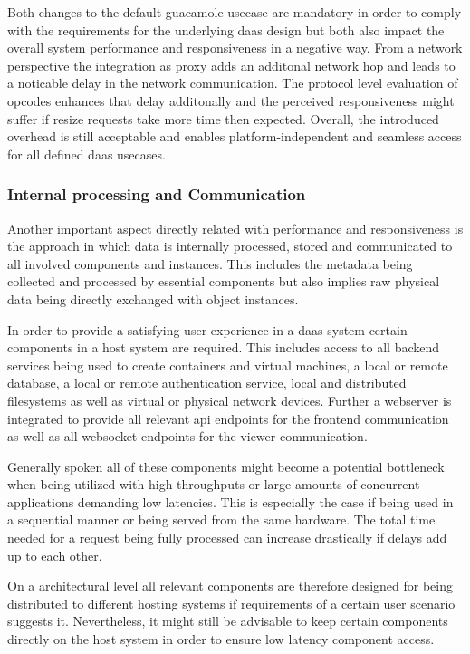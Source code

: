 \documentclass[runningheads]{llncs}
\begin{document}
Both changes to the default guacamole usecase are mandatory
in order to comply with the requirements for the underlying daas design
but both also impact the overall system performance and responsiveness in a negative way.
From a network perspective the integration as proxy adds an additonal network hop
and leads to a noticable delay in the network communication.
The protocol level evaluation of opcodes enhances that delay additonally
and the perceived responsiveness might suffer
if resize requests take more time then expected.
Overall, the introduced overhead is still acceptable
and enables platform-independent and seamless access for all defined daas usecases.

\subsubsection{Internal processing and Communication}
Another important aspect directly related with performance and responsiveness
is the approach in which data is internally processed, stored and communicated
to all involved components and instances.
This includes the metadata being collected and processed by essential components
but also implies raw physical data being directly exchanged with object instances.

In order to provide a satisfying user experience in a daas system
certain components in a host system are required.
This includes access to all backend services
being used to create containers and virtual machines,
a local or remote database, a local or remote authentication service,
local and distributed filesystems as well as
virtual or physical network devices.
Further a webserver is integrated to provide all relevant api endpoints
for the frontend communication
as well as all websocket endpoints for the viewer communication.

Generally spoken all of these components might become a potential bottleneck
when being utilized with high throughputs
or large amounts of concurrent applications demanding low latencies.
This is especially the case if being used in a sequential manner
or being served from the same hardware.
The total time needed for a request being fully processed
can increase drastically if delays add up to each other.

On a architectural level all relevant components are therefore designed
for being distributed to different hosting systems
if requirements of a certain user scenario suggests it.
Nevertheless, it might still be advisable
to keep certain components directly on the host system
in order to ensure low latency component access.
\end{document}
